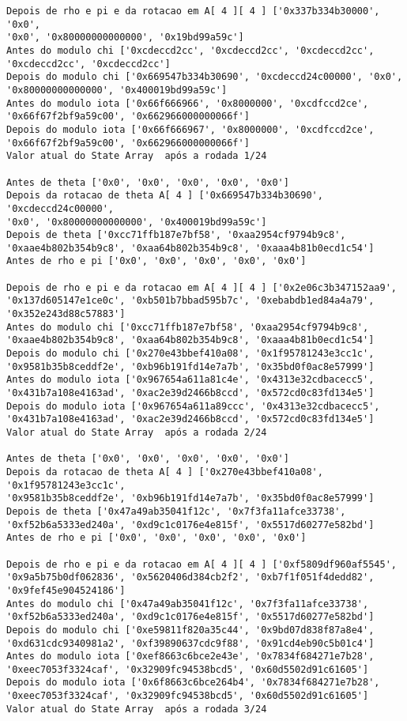 \documentclass[12pt, a4paper]{article}
\begin{document}
\begin{enumerate}
\begin{enumerate}
\begin{verbatim}
Depois de rho e pi e da rotacao em A[ 4 ][ 4 ] ['0x337b334b30000', '0x0',
'0x0', '0x80000000000000', '0x19bd99a59c']
Antes do modulo chi ['0xcdeccd2cc', '0xcdeccd2cc', '0xcdeccd2cc',
'0xcdeccd2cc', '0xcdeccd2cc']
Depois do modulo chi ['0x669547b334b30690', '0xcdeccd24c00000', '0x0',
'0x80000000000000', '0x400019bd99a59c']
Antes do modulo iota ['0x66f666966', '0x8000000', '0xcdfccd2ce',
'0x66f67f2bf9a59c00', '0x662966000000066f']
Depois do modulo iota ['0x66f666967', '0x8000000', '0xcdfccd2ce',
'0x66f67f2bf9a59c00', '0x662966000000066f']
Valor atual do State Array  após a rodada 1/24

Antes de theta ['0x0', '0x0', '0x0', '0x0', '0x0']
Depois da rotacao de theta A[ 4 ] ['0x669547b334b30690', '0xcdeccd24c00000',
'0x0', '0x80000000000000', '0x400019bd99a59c']
Depois de theta ['0xcc71ffb187e7bf58', '0xaa2954cf9794b9c8',
'0xaae4b802b354b9c8', '0xaa64b802b354b9c8', '0xaaa4b81b0ecd1c54']
Antes de rho e pi ['0x0', '0x0', '0x0', '0x0', '0x0']

Depois de rho e pi e da rotacao em A[ 4 ][ 4 ] ['0x2e06c3b347152aa9',
'0x137d605147e1ce0c', '0xb501b7bbad595b7c', '0xebabdb1ed84a4a79',
'0x352e243d88c57883']
Antes do modulo chi ['0xcc71ffb187e7bf58', '0xaa2954cf9794b9c8',
'0xaae4b802b354b9c8', '0xaa64b802b354b9c8', '0xaaa4b81b0ecd1c54']
Depois do modulo chi ['0x270e43bbef410a08', '0x1f95781243e3cc1c',
'0x9581b35b8ceddf2e', '0xb96b191fd14e7a7b', '0x35bd0f0ac8e57999']
Antes do modulo iota ['0x967654a611a81c4e', '0x4313e32cdbacecc5',
'0x431b7a108e4163ad', '0xac2e39d2466b8ccd', '0x572cd0c83fd134e5']
Depois do modulo iota ['0x967654a611a89ccc', '0x4313e32cdbacecc5',
'0x431b7a108e4163ad', '0xac2e39d2466b8ccd', '0x572cd0c83fd134e5']
Valor atual do State Array  após a rodada 2/24

Antes de theta ['0x0', '0x0', '0x0', '0x0', '0x0']
Depois da rotacao de theta A[ 4 ] ['0x270e43bbef410a08', '0x1f95781243e3cc1c',
'0x9581b35b8ceddf2e', '0xb96b191fd14e7a7b', '0x35bd0f0ac8e57999']
Depois de theta ['0x47a49ab35041f12c', '0x7f3fa11afce33738',
'0xf52b6a5333ed240a', '0xd9c1c0176e4e815f', '0x5517d60277e582bd']
Antes de rho e pi ['0x0', '0x0', '0x0', '0x0', '0x0']

Depois de rho e pi e da rotacao em A[ 4 ][ 4 ] ['0xf5809df960af5545',
'0x9a5b75b0df062836', '0x5620406d384cb2f2', '0xb7f1f051f4dedd82',
'0x9fef45e904524186']
Antes do modulo chi ['0x47a49ab35041f12c', '0x7f3fa11afce33738',
'0xf52b6a5333ed240a', '0xd9c1c0176e4e815f', '0x5517d60277e582bd']
Depois do modulo chi ['0xe59811f820a35c44', '0x9bd07d838f87a8e4',
'0xd631cdc9340981a2', '0xf39890637cdc9f88', '0x91cd4eb90c5b01c4']
Antes do modulo iota ['0xef8663c6bce2e43e', '0x7834f684271e7b28',
'0xeec7053f3324caf', '0x32909fc94538bcd5', '0x60d5502d91c61605']
Depois do modulo iota ['0x6f8663c6bce264b4', '0x7834f684271e7b28',
'0xeec7053f3324caf', '0x32909fc94538bcd5', '0x60d5502d91c61605']
Valor atual do State Array  após a rodada 3/24


\end{verbatim}
\end{enumerate}
\end{enumerate}
\end{document}
